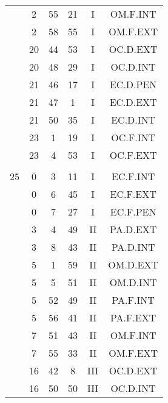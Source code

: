 \documentclass[12pt, a4paper]{article}
\begin{document}
\begin{multicols}{3}
{\begin{tabular}{c c c c c c}
	 	 	 	 & 2 & 55 & 21 & I & OM.F.INT\\%
	 	 	 	 & 2 & 58 & 55 & I & OM.F.EXT\\%
	 	 	 	 & 20 & 44 & 53 & I & OC.D.EXT\\%
	 	 	 	 & 20 & 48 & 29 & I & OC.D.INT\\%
	 	 	 	 & 21 & 46 & 17 & I & EC.D.PEN\\%
	 	 	 	 & 21 & 47 & 1 & I & EC.D.EXT\\%
	 	 	 	 & 21 & 50 & 35 & I & EC.D.INT\\%
	 	 	 	 & 23 & 1 & 19 & I & OC.F.INT\\%
	 	 	 	 & 23 & 4 & 53 & I & OC.F.EXT\\%
	 	 	 	 & & & & & \\%
	 	 	 	25 & 0 & 3 & 11 & I & EC.F.INT\\%
	 	 	 	 & 0 & 6 & 45 & I & EC.F.EXT\\%
	 	 	 	 & 0 & 7 & 27 & I & EC.F.PEN\\%
	 	 	 	 & 3 & 4 & 49 & II & PA.D.EXT\\%
	 	 	 	 & 3 & 8 & 43 & II & PA.D.INT\\%
	 	 	 	 & 5 & 1 & 59 & II & OM.D.EXT\\%
	 	 	 	 & 5 & 5 & 51 & II & OM.D.INT\\%
	 	 	 	 & 5 & 52 & 49 & II & PA.F.INT\\%
	 	 	 	 & 5 & 56 & 41 & II & PA.F.EXT\\%
	 	 	 	 & 7 & 51 & 43 & II & OM.F.INT\\%
	 	 	 	 & 7 & 55 & 33 & II & OM.F.EXT\\%
	 	 	 	 & 16 & 42 & 8 & III & OC.D.EXT\\%
	 	 	 	 & 16 & 50 & 50 & III & OC.D.INT\\%

\end{tabular}}
\end{multicols}
\end{document}
